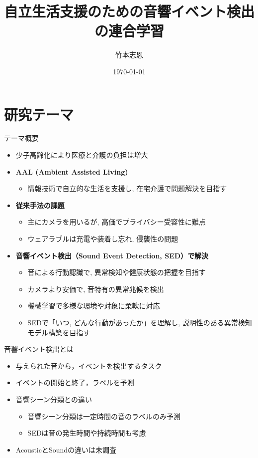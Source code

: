 \documentclass[unicode,12pt,aspectratio=169,dvipdfmx]{beamer}
\title{\textbf{自立生活支援のための音響イベント検出の連合学習}}
\author{竹本志恩}
\date{\today}
\begin{document}
\begin{frame}
  \titlepage
\end{frame}

\section{研究テーマ}
\begin{frame}{テーマ概要}
    \begin{itemize}
        \item 少子高齢化により医療と介護の負担は増大
        \item \textbf{AAL (Ambient Assisted Living)} \cite{blackman2016ambient,stodczyk2020ambient}
        \begin{itemize}
            \item 情報技術で自立的な生活を支援し, 在宅介護で問題解決を目指す
        \end{itemize}
            \item \textbf{従来手法の課題}
        \begin{itemize}
            \item 主にカメラを用いるが, 高価でプライバシー受容性に難点
            \item ウェアラブルは充電や装着し忘れ, 侵襲性の問題
        \end{itemize}
        \item \textbf{音響イベント検出（Sound Event Detection, SED）で解決}
        \begin{itemize}
            \item 音による行動認識で, 異常検知や健康状態の把握を目指す
            \item カメラより安価で, 音特有の異常兆候を検出
            \item 機械学習で多様な環境や対象に柔軟に対応
            \item SEDで「いつ, どんな行動があったか」を理解し, 説明性のある異常検知モデル構築を目指す
        \end{itemize}
    \end{itemize}
\end{frame}


\begin{frame}{音響イベント検出とは}
    \begin{itemize}
        \item 与えられた音から，イベントを検出するタスク
        \item イベントの開始と終了，ラベルを予測
        \item 音響シーン分類との違い
        \begin{itemize}
            \item 音響シーン分類は一定時間の音のラベルのみ予測
            \item SEDは音の発生時間や持続時間も考慮
        \end{itemize}
        \item AcousticとSoundの違いは未調査
    \end{itemize}
\end{frame}
\end{document}
